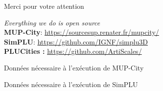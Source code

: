\documentclass[xcolor=table]{beamer}
\begin{document}
\begin{frame}[standout]
	\centering
	\begin{block}{}	
		\centering	
		Merci pour votre attention
	\end{block}
	\begin{block}{}
		\centering
		\textit{Everything we do is open source}\\
		\large
		\textbf{MUP-City}: \url{https://sourcesup.renater.fr/mupcity/} \\
		\textbf{SimPLU}: \url{https://github.com/IGNF/simplu3D}\\
		\textbf{PLUCities :} \url{https://github.com/ArtiScales/}  
	\end{block}
\end{frame}

\begin{frame}{Données nécessaire à l'exécution de MUP-City}
\end{frame}
\begin{frame}{Données nécessaire à l'exécution de SimPLU}
\end{frame}
\end{document}
